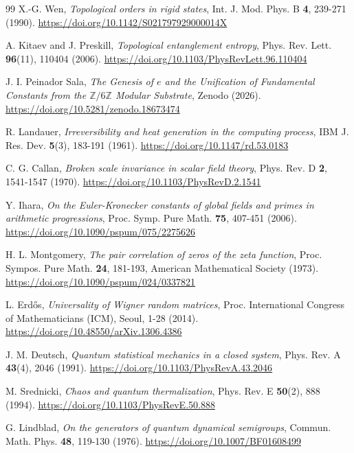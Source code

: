 \documentclass[12pt,a4paper]{article}
\theoremstyle{plain}
\theoremstyle{definition}
\theoremstyle{remark}
\begin{document}
\begin{thebibliography}{99}
X.-G. Wen, \textit{Topological orders in rigid states}, Int. J. Mod. Phys. B \textbf{4}, 239-271 (1990). \url{https://doi.org/10.1142/S021797929000014X}

A. Kitaev and J. Preskill, \textit{Topological entanglement entropy}, Phys. Rev. Lett. \textbf{96}(11), 110404 (2006). \url{https://doi.org/10.1103/PhysRevLett.96.110404}

J. I. Peinador Sala, \textit{The Genesis of $e$ and the Unification of Fundamental Constants from the $\mathbb{Z}/6\mathbb{Z}$ Modular Substrate}, Zenodo (2026). \url{https://doi.org/10.5281/zenodo.18673474}

R. Landauer, \textit{Irreversibility and heat generation in the computing process}, IBM J. Res. Dev. \textbf{5}(3), 183-191 (1961). \url{https://doi.org/10.1147/rd.53.0183}

C. G. Callan, \textit{Broken scale invariance in scalar field theory}, Phys. Rev. D \textbf{2}, 1541-1547 (1970). \url{https://doi.org/10.1103/PhysRevD.2.1541}

Y. Ihara, \textit{On the Euler-Kronecker constants of global fields and primes in arithmetic progressions}, Proc. Symp. Pure Math. \textbf{75}, 407-451 (2006). \url{https://doi.org/10.1090/pspum/075/2275626}

H. L. Montgomery, \textit{The pair correlation of zeros of the zeta function}, Proc. Sympos. Pure Math. \textbf{24}, 181-193, American Mathematical Society (1973). \url{https://doi.org/10.1090/pspum/024/0337821}

L. Erdős, \textit{Universality of Wigner random matrices}, Proc. International Congress of Mathematicians (ICM), Seoul, 1-28 (2014). \url{https://doi.org/10.48550/arXiv.1306.4386}

J. M. Deutsch, \textit{Quantum statistical mechanics in a closed system}, Phys. Rev. A \textbf{43}(4), 2046 (1991). \url{https://doi.org/10.1103/PhysRevA.43.2046}

M. Srednicki, \textit{Chaos and quantum thermalization}, Phys. Rev. E \textbf{50}(2), 888 (1994). \url{https://doi.org/10.1103/PhysRevE.50.888}

G. Lindblad, \textit{On the generators of quantum dynamical semigroups}, Commun. Math. Phys. \textbf{48}, 119-130 (1976). \url{https://doi.org/10.1007/BF01608499}


\end{thebibliography}
\end{document}
